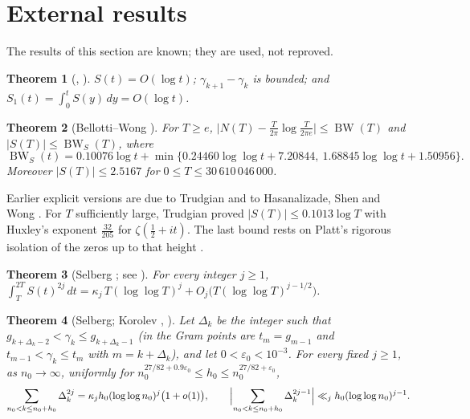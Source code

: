 \documentclass[preprint,12pt]{elsarticle}
\numberwithin{equation}{section}
\theoremstyle{plain}
\newtheorem{theorem}{Theorem}[section]
\theoremstyle{definition}
\theoremstyle{remark}
\newcommand{\BW}{\operatorname{BW}}
\newcommand{\BWS}{\operatorname{BW}_S}
\begin{document}

\section{External results}
\label{sec:known_results}

The results of this section are known; they are used, not reproved.

\begin{theorem}[{\cite[Thms.~9.4, 9.9 and \S9.12]{Titchmarsh1986}}, {\cite{Littlewood1924}}]\label{thm:known_basic}
$S(t)=O(\log t)$; $\gamma_{k+1}-\gamma_k$ is bounded; and $S_1(t)=\int_0^tS(y)\,dy=O(\log t)$.
\end{theorem}

\begin{theorem}[Bellotti--Wong {\cite[Thm.~1.1, Cor.~1.5 and (1.2)]{BellottiWong2025}}]\label{thm:known_BW}
For $T\ge e$, $\bigl|N(T)-\frac T{2\pi}\log\frac T{2\pi e}\bigr|\le\BW(T)$ and $|S(T)|\le\BWS(T)$, where
\begin{equation}
\BWS(t)=0.10076\log t+\min\{0.24460\log\log t+7.20844,\ 1.68845\log\log t+1.50956\}.
\label{eq:BWS_def}
\end{equation}
Moreover $|S(T)|\le2.5167$ for $0\le T\le30\,610\,046\,000$.
\end{theorem}
Earlier explicit versions are due to Trudgian \cite{Trudgian2014} and to Hasanalizade, Shen and Wong \cite{HasanalizadeShenWong2022}. For $T$ sufficiently large, Trudgian \cite[\S5 of the preprint]{Trudgian2010} proved $|S(T)|\le0.1013\log T$ with Huxley\textquoteright s exponent $\frac{32}{205}$ for $\zeta(\frac12+it)$. The last bound rests on Platt's rigorous isolation of the zeros up to that height \cite[(1.2)]{BellottiWong2025}.

\begin{theorem}[Selberg {\cite{Selberg1946a}}; see {\cite[p.~225]{Fujii1974}}]\label{thm:known_selberg_moments}
For every integer $j\ge1$, $\int_T^{2T}S(t)^{2j}\,dt=\kappa_j\,T(\log\log T)^j+O_j\bigl(T(\log\log T)^{j-1/2}\bigr)$.
\end{theorem}

\begin{theorem}[Selberg; Korolev {\cite{Korolev2012}}, {\cite[Thm.~4.2]{Korolev2011}}]\label{thm:known_korolev}
Let $\Delta_k$ be the integer such that $g_{k+\Delta_k-2}<\gamma_k\le g_{k+\Delta_k-1}$ (in \cite{Korolev2011} the Gram points are $t_m=g_{m-1}$ and $t_{m-1}<\gamma_k\le t_m$ with $m=k+\Delta_k$), and let $0<\varepsilon_0<10^{-3}$. For every fixed $j\ge1$, as $n_0\to\infty$, uniformly for $n_0^{27/82+0.9\varepsilon_0}\le h_0\le n_0^{27/82+\varepsilon_0}$,
\begin{equation}
\sum_{n_0<k\le n_0+h_0}\Delta_k^{2j}=\kappa_jh_0(\log\log n_0)^j\bigl(1+o(1)\bigr),\qquad
\Bigl|\sum_{n_0<k\le n_0+h_0}\Delta_k^{2j-1}\Bigr|\ll_j h_0(\log\log n_0)^{j-1}.
\label{eq:korolev_moments}
\end{equation}
\end{theorem}
\end{document}
